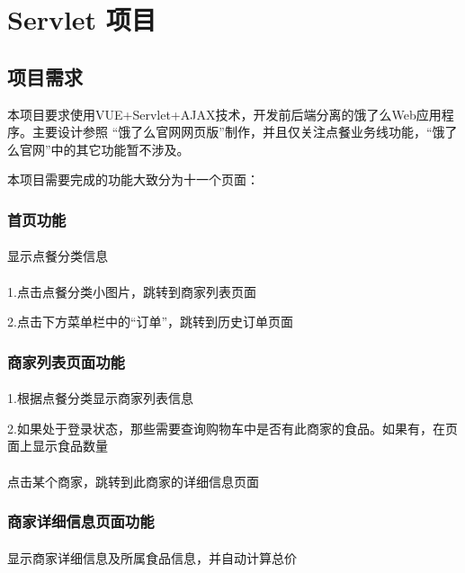 
\chapter{Servlet 项目}

\section{项目需求}

本项目要求使用VUE+Servlet+AJAX技术，开发前后端分离的饿了么Web应用程序。主要设计参照 “饿了么官网网页版”制作，并且仅关注点餐业务线功能，“饿了么官网”中的其它功能暂不涉及。

本项目需要完成的功能大致分为十一个页面：

\subsection{首页功能}
\subsubsection*{}
显示点餐分类信息
\subsubsection*{}
1.点击点餐分类小图片，跳转到商家列表页面

2.点击下方菜单栏中的“订单”，跳转到历史订单页面

\subsection{商家列表页面功能}
\subsubsection*{}
1.根据点餐分类显示商家列表信息

2.如果处于登录状态，那些需要查询购物车中是否有此商家的食品。如果有，在页面上显示食品数量
\subsubsection*{}
点击某个商家，跳转到此商家的详细信息页面

\subsection{商家详细信息页面功能}
\subsubsection*{}
显示商家详细信息及所属食品信息，并自动计算总价
